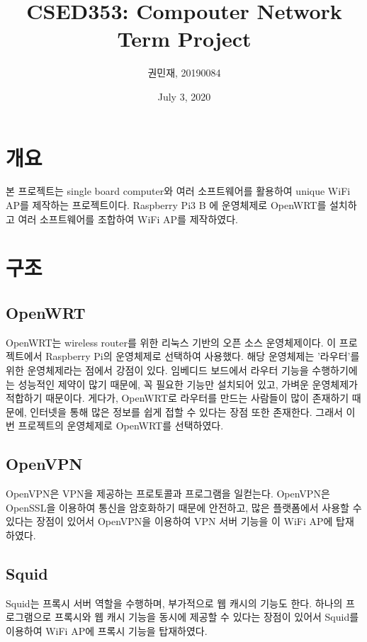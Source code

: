 \documentclass{article}
\begin{document}
    \author{\large 권민재, 20190084}
    \title{\Large\textbf{CSED353: Compouter Network Term Project}}
    \date{\small July 3, 2020}
    \maketitle
    \newpage

    \tableofcontents

    \newpage
    \section{개요}
     본 프로젝트는 single board computer와 여러 소프트웨어를 활용하여 unique WiFi AP를 제작하는 프로젝트이다.
     Raspberry Pi3 B 에 운영체제로 OpenWRT를 설치하고 여러 소프트웨어를 조합하여 WiFi AP를 제작하였다.

    \section{구조}

    \subsection{OpenWRT}
     OpenWRT는 wireless router를 위한 리눅스 기반의 오픈 소스 운영체제이다. 이 프로젝트에서 Raspberry Pi의 운영체제로 선택하여 사용했다.
     해당 운영체제는 '라우터'를 위한 운영체제라는 점에서 강점이 있다. 임베디드 보드에서 라우터 기능을 수행하기에는 성능적인 제약이 많기 때문에,
    꼭 필요한 기능만 설치되어 있고, 가벼운 운영체제가 적합하기 때문이다. 게다가, OpenWRT로 라우터를 만드는 사람들이 많이 존재하기 때문에,
     인터넷을 통해 많은 정보를 쉽게 접할 수 있다는 장점 또한 존재한다. 그래서 이번 프로젝트의 운영체제로 OpenWRT를 선택하였다.
    \subsection{OpenVPN}
     OpenVPN은 VPN을 제공하는 프로토콜과 프로그램을 일컫는다. OpenVPN은 OpenSSL을 이용하여 통신을 암호화하기 때문에 안전하고, 많은 플랫폼에서 사용할 수 있다는 장점이 있어서
     OpenVPN을 이용하여 VPN 서버 기능을 이 WiFi AP에 탑재하였다.
    \subsection{Squid}
     Squid는 프록시 서버 역할을 수행하며, 부가적으로 웹 캐시의 기능도 한다.
     하나의 프로그램으로 프록시와 웹 캐시 기능을 동시에 제공할 수 있다는 장점이 있어서 Squid를 이용하여 WiFi AP에 프록시 기능을 탑재하였다.
\end{document}
